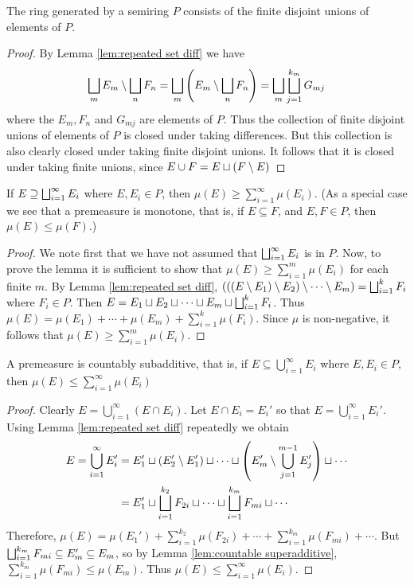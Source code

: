 \begin{corollary}\label{cor:ring generated by semiring}
The ring generated by a semiring $P$ consists of the finite disjoint unions of elements of $P$.
\end{corollary}

\begin{proof}
By Lemma \ref{lem:repeated set diff} we have \[\bigsqcup_mE_m\setminus\bigsqcup_nF_n=\bigsqcup_m\left(E_m\setminus\bigsqcup_nF_n\right)=\bigsqcup_m\bigsqcup_{j=1}^{k_m}G_{mj}\] where the $E_m, F_n$ and $G_{mj}$ are elements of $P$. Thus the collection of finite disjoint unions of elements of $P$ is closed under taking differences. But this collection is also clearly closed under taking finite disjoint unions. It follows that it is closed under taking finite unions, since $E\cup F=E\sqcup(F\setminus E)$
\end{proof}


\begin{lemma}\label{lem:countable superadditive}
If $E\supseteq\bigsqcup_{i=1}^\infty E_i$ where $E,E_i\in P$, then $\mu(E)\geq\sum_{i=1}^\infty\mu(E_i)$. (As a special case we see that a premeasure is monotone, that is, if $E\subseteq F$, and $E,F\in P$, then $\mu(E)\leq\mu(F)$.)
\end{lemma}

\begin{proof}
We note first that we have not assumed that $\bigsqcup_{i=1}^\infty E_i$ is in $P$. Now, to prove the lemma it is sufficient to show that $\mu(E)\geq\sum_{i=1}^m\mu(E_i)$ for each finite $m$. By Lemma \ref{lem:repeated set diff}, $(((E\setminus E_1)\setminus E_2)\setminus\cdots\setminus E_m)=\bigsqcup_{i=1}^kF_i$ where $F_i\in P$. Then $E=E_1\sqcup E_2\sqcup\cdots\sqcup E_m\sqcup\bigsqcup_{i=1}^kF_i$. Thus $\mu(E)=\mu(E_1)+\cdots+\mu(E_m)+\sum_{i=1}^k\mu(F_i)$. Since $\mu$ is non-negative, it follows that $\mu(E)\geq\sum_{i=1}^m\mu(E_i)$.
\end{proof}

\begin{lemma}
A premeasure is countably subadditive, that is, if $E\subseteq\bigcup_{i=1}^\infty E_i$ where $E,E_i\in P$, then $\mu(E)\leq\sum_{i=1}^\infty\mu(E_i)$ 
\end{lemma}

\begin{proof}
Clearly $E=\bigcup_{i=1}^\infty(E\cap E_i)$. Let $E\cap E_i=E_i'$ so that $E=\bigcup_{i=1}^\infty E_i'$. Using Lemma \ref{lem:repeated set diff} repeatedly we obtain 
\begin{align*}
    E=\bigcup_{i=1}^\infty E_i'&=E_1'\sqcup(E_2'\setminus E_1')\sqcup\cdots\sqcup\left(E_m'\setminus\bigcup_{j=1}^{m-1}E_j'\right)\sqcup\cdots\\
    &=E_1'\sqcup\bigsqcup_{i=1}^{k_2}F_{2i}\sqcup\cdots\sqcup\bigsqcup_{i=1}^{k_m} F_{mi}\sqcup\cdots\\
\end{align*}
Therefore, $\mu(E)=\mu(E_1')+\sum_{i=1}^{k_2}\mu(F_{2i})+\cdots+\sum_{i=1}^{k_m}\mu(F_{mi})+\cdots$. But $\bigsqcup_{i=1}^{k_m}F_{mi}\subseteq E_m'\subseteq E_m$, so by Lemma \ref{lem:countable superadditive}, $\sum_{i=1}^{k_m}\mu(F_{mi})\leq\mu(E_m)$. Thus $\mu(E)\leq\sum_{i=1}^\infty\mu(E_i)$.
\end{proof}

